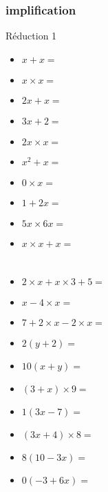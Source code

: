 \documentclass{beamer}
\begin{document}
\begin{frame}
  \frametitle{implification}
  \begin{exampleblock}{Réduction 1}
  \begin{multicols}{2}
    \begin{itemize}
    \item<1-> $ x + x                      = $
    \item<2-> $ x \times x                 = $
    \item<3-> $ 2x + x                     = $
    \item<4-> $ 3x + 2                     = $
    \item<5-> $ 2x \times x                = $
    \item<6-> $ x^2 + x                    = $
    \item<7-> $ 0 \times x                  = $
    \item<8-> $ 1 + 2x                      = $    
    \item<9-> $  5x \times 6x               = $  
    \item<10-> $ x \times x + x              = $
    \end{itemize}
    \end{multicols}
  \end{exampleblock}
\end{frame}


\section{}

\begin{frame}
  \begin{exampleblock}{1}
    \begin{itemize}
\item $2 \times x + x \times 3 + 5 = $ 
\item $x -4 \times x               = $
\item $7 + 2 \times x - 2 \times x = $
\item $2(y + 2)                    = $
\item $10( x + y)                  = $
    \end{itemize}
  \end{exampleblock}
\end{frame}

\begin{frame}
  \begin{exampleblock}{2}
    \begin{itemize}
    \item $ (3 + x) \times 9        = $
    \item $ 1 (3x - 7)              = $
    \item $ (3x + 4) \times 8       = $
    \item $ 8 (10 - 3x)             = $
    \item $ 0 (-3 + 6x)             = $
    \end{itemize}
  \end{exampleblock}
\end{frame}
\end{document}
